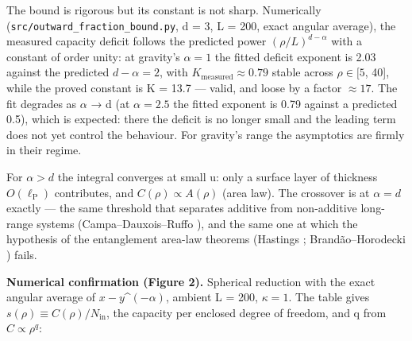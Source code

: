 \documentclass[aps,prd,preprint,nofootinbib,superscriptaddress]{revtex4-2}
\begin{document}
The bound is rigorous but its constant is not sharp. Numerically
(\texttt{src/\allowbreak outward\_\allowbreak fraction\_\allowbreak bound.\allowbreak py}, d = 3, L = 200, exact angular
average), the measured capacity deficit follows the predicted power
\((\rho /L)^{d-\alpha }\) with a constant of order unity: at gravity's
\(\alpha  = 1\) the fitted deficit exponent is 2.03 against the
predicted \(d - \alpha  = 2\), with
\(K_{\mathrm{measured}} \approx  0.79\) stable across \(\rho  \in  [5\),
40{]}, while the proved constant is K = 13.7 --- valid, and loose by a
factor \(\approx  17\). The fit degrades as \(\alpha\) → d (at
\(\alpha  = 2.5\) the fitted exponent is 0.79 against a predicted 0.5),
which is expected: there the deficit is no longer small and the leading
term does not yet control the behaviour. For gravity's range the
asymptotics are firmly in their regime.

For \(\alpha  > d\) the integral converges at small u: only a surface
layer of thickness \(O(\ell _{\mathrm{P}})\) contributes, and
\(C(\rho ) \propto  A(\rho )\) (area law). The crossover is at
\(\alpha  = d\) exactly --- the same threshold that separates additive
from non-additive long-range systems (Campa--Dauxois--Ruffo
\citep{Campa:2009jxa}), and the same one at which the hypothesis of the
entanglement area-law theorems (Hastings \citep{Hastings:2007iok};
Brandão--Horodecki \citep{Brandao:2013fpa}) fails.

\textbf{Numerical confirmation (Figure 2).} Spherical reduction with the
exact angular average of \textbar{}\(x-y\)\textbar\^{}\((-\alpha )\),
ambient L = 200, \(\kappa  = 1\). The table gives
\(s(\rho ) \equiv  C(\rho )/N_{\mathrm{in}}\), the capacity per enclosed
degree of freedom, and q from \(C \propto  \rho ^{q}\):
\end{document}

